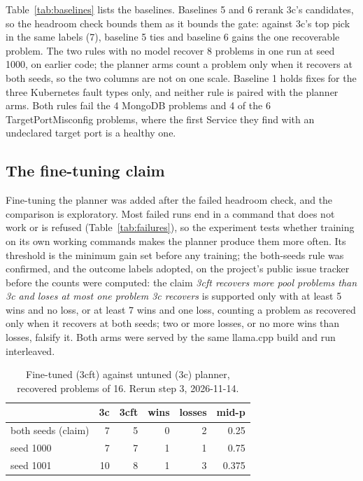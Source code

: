 \documentclass[10pt,conference]{IEEEtran}
\begin{document}
Table~\ref{tab:baselines} lists the baselines. Baselines 5 and 6 rerank 3c's candidates, so the
headroom check bounds them as it bounds the gate: against 3c's top pick in the same labels (7),
baseline 5 ties and baseline 6 gains the one recoverable problem. The two rules with no model
recover 8 problems in one run at seed 1000, on earlier code; the planner arms count a problem only
when it recovers at both seeds, so the two columns are not on one scale. Baseline 1 holds fixes for
the three Kubernetes fault types only, and neither rule is paired with the planner arms. Both rules
fail the 4 MongoDB problems and 4 of the 6 TargetPortMisconfig problems, where the first Service
they find with an undeclared target port is a healthy one.

\subsection{The fine-tuning claim}

Fine-tuning the planner was added after the failed headroom check, and the comparison is
exploratory. Most failed runs end in a command that does not work or is refused
(Table~\ref{tab:failures}), so the experiment tests whether training on its own working commands
makes the planner produce them more often. Its threshold is the minimum gain set before any
training; the both-seeds rule was confirmed, and the outcome labels adopted, on the project's public
issue tracker before the counts were computed: the claim
\emph{3cft recovers more pool problems than 3c and loses at most one problem 3c recovers} is
supported only with at least 5 wins and no loss, or at least 7 wins and one loss, counting a
problem as recovered only when it recovers at both seeds; two or more losses, or no more wins than
losses, falsify it. Both arms were served by the same llama.cpp build and run
interleaved.

\begin{table}[!t]
\caption{Fine-tuned (3cft) against untuned (3c) planner, recovered problems of 16. Rerun step 3,
2026-11-14.}
\label{tab:finetune}
\centering\footnotesize
\begin{tabularx}{\columnwidth}{@{}Yrrrrr@{}}
\hline
 & 3c & 3cft & wins & losses & mid-p \\
\hline
both seeds (claim) & 7 & 5 & 0 & 2 & 0.25 \\
seed 1000 & 7 & 7 & 1 & 1 & 0.75 \\
seed 1001 & 10 & 8 & 1 & 3 & 0.375 \\
\hline
\end{tabularx}
\end{table}
\end{document}
